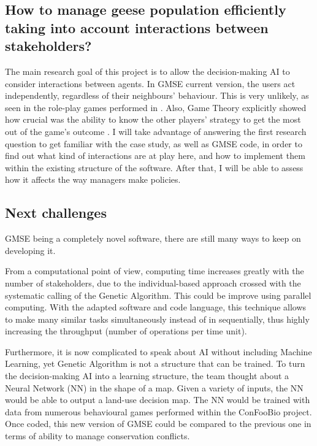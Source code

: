 \documentclass[12pt,a4paper]{article}
\begin{document}
\subsection{How to manage geese population efficiently taking into account interactions between stakeholders?}

The main research goal of this project is to allow the decision-making AI to consider interactions between agents.
In GMSE current version, the users act independently, regardless of their neighbours' behaviour.
This is very unlikely, as seen in the role-play games performed in \cite{redpath2018games}.
Also, Game Theory explicitly showed how crucial was the ability to know the other players' strategy to get the most out of the game's outcome \citep{hilbe2018evolution}.
I will take advantage of answering the first research question to get familiar with the case study, as well as GMSE code, in order to find out what kind of interactions are at play here, and how to implement them within the existing structure of the software.
After that, I will be able to assess how it affects the way managers make policies.

\subsection{Next challenges}

GMSE being a completely novel software, there are still many ways to keep on developing it.

From a computational point of view, computing time increases greatly with the number of stakeholders, due to the individual-based approach crossed with the systematic calling of the Genetic Algorithm.
This could be improve using parallel computing.
With the adapted software and code language, this technique allows to make many similar tasks simultaneously instead of in sequentially, thus highly increasing the throughput (number of operations per time unit).

Furthermore, it is now complicated to speak about AI without including Machine Learning, yet Genetic Algorithm is not a structure that can be trained.
To turn the decision-making AI into a learning structure, the team thought about a Neural Network (NN) in the shape of a map.
Given a variety of inputs, the NN would be able to output a land-use decision map.
The NN would be trained with data from numerous behavioural games performed within the ConFooBio project.
Once coded, this new version of GMSE could be compared to the previous one in terms of ability to manage conservation conflicts.
%

\newpage

\nocite{*}
\end{document}
